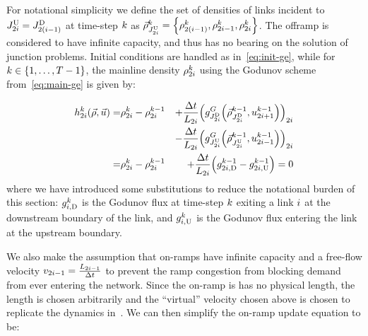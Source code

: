			For notational simplicity we define the set of densities of links
			incident to $\jup{2\link}=\jdown{2\left(\link-1\right)}$ at time-step
			$k$ as $\juncstate{\jup{2\link}}{\tind}=\left\{ \discrete{2\left(\link-1\right)}{\tind},\discrete{2i-1}{\tind},\discrete{2\link}{\tind}\right\} $.
			The offramp is considered to have infinite capacity, and thus has
			no bearing on the solution of junction problems. Initial conditions
			are handled as in~\eqref{eq:init-ge}, while for $k\in\intrange 1{\ntime-1}$,
			the mainline density $\rho_{2i}^{k}$ using the Godunov
			scheme from~\eqref{eq:main-ge} is given by:
						
			\begin{eqnarray}
				\syseq_{2\link}^{\tind}(\state,\control)= & \discrete{2\link}{\tind}-\discrete{2\link}{\tind-1} & +\dfrac{\Delta t}{\length_{2\link}}\left(\god_{\jdown{2\link}}\left(\juncstate{\jdown{2\link}}{\tind-1},\ramp_{2\link+1}^{\tind-1}\right)\right)_{2\link}\label{eq:rho-update}\\
				&  & -\dfrac{\Delta t}{\length_{2\link}}\left(\god_{\jup{2\link}}\left(\juncstate{\jup{2\link}}{\tind-1},\ramp_{2\link-1}^{\tind-1}\right)\right)_{2\link}\nonumber \\
				= & \discrete{2\link}{\tind}-\discrete{2\link}{\tind-1} & +\frac{\Delta t}{\length_{2\link}}\left(\fout{2\link}{\tind-1}-\fin{2\link}{\tind-1}\right)=0
			\end{eqnarray}
			where we have introduced some substitutions to reduce the notational
			burden of this section: $g_{i,\text{D}}^{k}$ is the Godunov flux
			at time-step $k$ exiting a link $i$ at the downstream boundary
			of the link, and $g_{i,\text{U}}^{k}$ is the Godunov flux entering
			the link at the upstream boundary.
						
			We also make the assumption that on-ramps have infinite capacity and
			a free-flow velocity $v_{2i-1}=\frac{L_{2i-1}}{\Delta t}$
			to prevent the ramp congestion from blocking demand from ever entering
			the network. Since the on-ramp is has no physical length, the length
			is chosen arbitrarily and the ``virtual'' velocity chosen above
			is chosen to replicate the dynamics in~\cite{Monache2013}. We can
			then simplify the on-ramp update equation to be:
						
